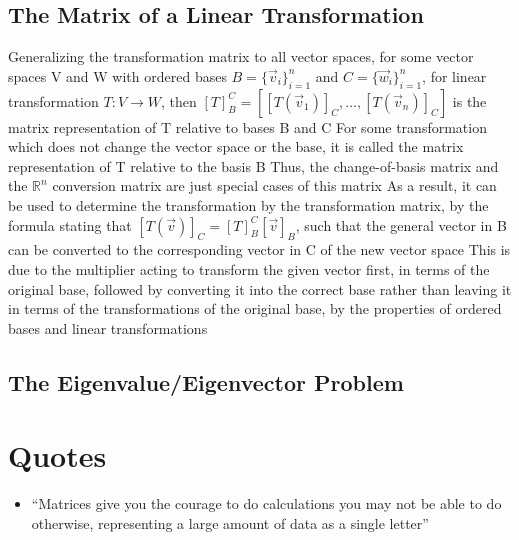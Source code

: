 \documentclass[11 pt, twoside]{article}
\newenvironment{outline*}
{
	\begin{outline}[enumerate]
	}
	{\end{outline}
}
\begin{document}
\subsection{The Matrix of a Linear Transformation}
\begin{outline*}
\1 Generalizing the transformation matrix to all vector spaces, for some vector spaces V and W with ordered bases $B = \{\vec{v}_i\}_{i=1}^n$ and $C = \{\vec{w}_i\}_{i=1}^n$, for linear transformation $T: V \to W$, then $[T]^C_B = [[T(\vec{v}_1)]_C, \dots, [T(\vec{v}_n)]_C]$ is the matrix representation of T relative to bases B and C
\2 For some transformation which does not change the vector space or the base, it is called the matrix representation of T relative to the basis B
\2 Thus, the change-of-basis matrix and the $\mathbb{R}^n$ conversion matrix are just special cases of this matrix
\2 As a result, it can be used to determine the transformation by the transformation matrix, by the formula stating that $[T(\vec{v})]_C = [T]^C_B[\vec{v}]_B$, such that the general vector in B can be converted to the corresponding vector in C of the new vector space
\2 This is due to the multiplier acting to transform the given vector first, in terms of the original base, followed by converting it into the correct base rather than leaving it in terms of the transformations of the original base, by the properties of ordered bases and linear transformations
\1
\end{outline*}
\subsection{The Eigenvalue/Eigenvector Problem}
\begin{outline*}
\1 
\end{outline*}
\section{Quotes}
\begin{itemize}
\item ``Matrices give you the courage to do calculations you may not be able to do otherwise, representing a large amount of data as a single letter''
\end{itemize}
\end{document}
